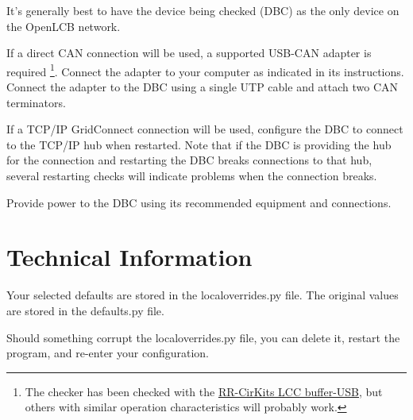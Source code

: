 \documentclass[11pt]{article}
\begin{document}
It's generally best to have the device being checked (DBC) 
as the only device on the OpenLCB network. 

If a direct CAN connection will be used,
a supported USB-CAN adapter is required
\footnote{The checker has been checked with the
\href{https://www.rr-cirkits.com/description/LCC-usb-flyer.pdf}{RR-CirKits LCC buffer-USB},
but others with similar operation characteristics will probably work.
}. 
Connect the adapter to your computer as indicated in its instructions.
Connect the adapter to the DBC using a single UTP cable
and attach two CAN terminators.

If a TCP/IP GridConnect connection will be used, 
configure the DBC to connect to the TCP/IP hub when restarted. Note that if 
the DBC is providing the hub for the connection and restarting the DBC
breaks connections to that hub, several restarting checks will indicate problems
when the connection breaks.

Provide power to the DBC using its recommended equipment and connections.


\section{Technical Information}

Your selected defaults are stored in the localoverrides.py file.
The original values are stored in the defaults.py file.

Should something corrupt the localoverrides.py file,
you can delete it, restart the program, and re-enter your configuration.
\end{document}
